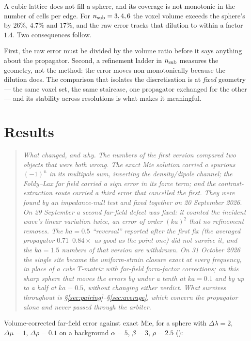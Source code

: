 \documentclass[11pt,a4paper]{article}
\begin{document}
A cubic lattice does not fill a sphere, and its coverage is not monotonic in
the number of cells per edge.  For $n_{\rm sub} = 3,4,6$ the voxel volume
exceeds the sphere's by $26\%$, $4.7\%$ and $17\%$, and the raw error tracks
that dilution to within a factor $1.4$.  Two consequences follow.

First, the raw error must be divided by the volume ratio before it says
anything about the propagator.  Second, a refinement ladder in $n_{\rm sub}$
measures the geometry, not the method: the error moves non-monotonically
because the dilution does.  The comparison that isolates the discretisation is
at \emph{fixed} geometry --- the same voxel set, the same staircase, one
propagator exchanged for the other --- and its stability across resolutions is
what makes it meaningful.

\section{Results}\label{sec:results}

\begin{quote}
\small\itshape
What changed, and why.  The numbers of the first version compared two objects
that were \emph{both} wrong.  The exact Mie solution carried a spurious $(-1)^n$
in its multipole sum, inverting the density/dipole channel; the Foldy--Lax far
field carried a sign error in its force term; and the contrast-extraction route
carried a third error that cancelled the first.  They were found by an
impedance-null test and fixed together on 20 September 2026.  On 29 September a
second far-field defect was fixed: it counted the incident wave's linear
variation twice, an error of order $(ka)^2$ that no refinement removes.  The
$ka = 0.5$ ``reversal'' reported after the first fix (the averaged propagator
$0.71$--$0.84\times$ as good as the point one) did not survive it, and the
$ka = 1.5$ numbers of that version are withdrawn.  On 31 October 2026 the single
site became the uniform-strain closure exact at every frequency, in place of a
cube $T$-matrix with far-field form-factor corrections; on this sharp sphere that
moves the errors by under a tenth at $ka = 0.1$ and by up to a half at $ka = 0.5$,
without changing either verdict.
What survives throughout is \S\ref{sec:pairing}--\S\ref{sec:average}, which
concern the propagator alone and never passed through the arbiter.
\end{quote}

Volume-corrected far-field error against exact Mie, for a sphere with
$\Delta\lambda = 2$, $\Delta\mu = 1$, $\Delta\rho = 0.1$ on a background
$\alpha=5$, $\beta=3$, $\rho=2.5$ ():
\end{document}
